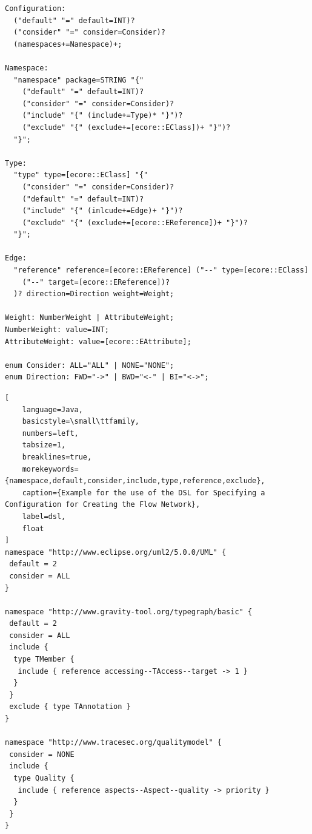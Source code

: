 \begin{lstlisting}[caption={Grammar of the DSL structured into multiple grammar rules}, label=lst:grammar, float, keywords={enum,INT,STRING},basicstyle=\small\ttfamily,breaklines]
Configuration:
  ("default" "=" default=INT)?
  ("consider" "=" consider=Consider)?
  (namespaces+=Namespace)+;

Namespace:
  "namespace" package=STRING "{"
    ("default" "=" default=INT)?
    ("consider" "=" consider=Consider)?
    ("include" "{" (include+=Type)* "}")?
    ("exclude" "{" (exclude+=[ecore::EClass])+ "}")?
  "}";

Type:
  "type" type=[ecore::EClass] "{"
    ("consider" "=" consider=Consider)?
    ("default" "=" default=INT)?
    ("include" "{" (inlcude+=Edge)+ "}")?
    ("exclude" "{" (exclude+=[ecore::EReference])+ "}")?
  "}";

Edge:
  "reference" reference=[ecore::EReference] ("--" type=[ecore::EClass]
    ("--" target=[ecore::EReference])?
  )? direction=Direction weight=Weight;

Weight: NumberWeight | AttributeWeight;
NumberWeight: value=INT;
AttributeWeight: value=[ecore::EAttribute];

enum Consider: ALL="ALL" | NONE="NONE";
enum Direction: FWD="->" | BWD="<-" | BI="<->";
\end{lstlisting}

\begin{lstlisting}[
    language=Java,
    basicstyle=\small\ttfamily,
    numbers=left,
    tabsize=1,
    breaklines=true,
    morekeywords={namespace,default,consider,include,type,reference,exclude},
    caption={Example for the use of the DSL for Specifying a Configuration for Creating the Flow Network},
    label=dsl,
    float
]
namespace "http://www.eclipse.org/uml2/5.0.0/UML" {
 default = 2
 consider = ALL
}

namespace "http://www.gravity-tool.org/typegraph/basic" {
 default = 2
 consider = ALL
 include {
  type TMember {
   include { reference accessing--TAccess--target -> 1 }
  }
 }
 exclude { type TAnnotation }
}

namespace "http://www.tracesec.org/qualitymodel" {
 consider = NONE
 include {
  type Quality {
   include { reference aspects--Aspect--quality -> priority }
  }
 }
}
\end{lstlisting}


